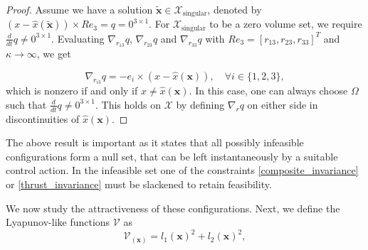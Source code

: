 \begin{proof}
Assume we have a solution $\tilde{\mathbf{x}} \in \mathcal{X}_\text{singular}$, denoted by $(x- \hat{x}(\tilde{\mathbf{x}})) \times R e_3 = q = 0^{3 \times 1}$.
For $\mathcal{X}_\text{singular}$ to be a zero volume set, we require $\frac{d}{dt} q \neq 0^{3 \times 1}$. Evaluating $\nabla_{r_{13}} q$, $\nabla_{r_{23}} q$ and $\nabla_{r_{33}} q$ with $R e_3 = [r_{13}, r_{23}, r_{33}]^T$ and $\kappa \rightarrow \infty$, we get 

\small
\begin{equation}\nonumber
\nabla_{r_{i3}} q = -e_i \times (x - \hat{x}(\mathbf{x})), \quad \forall i \in \{1,2,3\},
\end{equation}
\normalsize
which is nonzero if and only if $x \neq \hat{x}(\mathbf{x})$. In this case, one can always choose $\Omega$ such that $\frac{d}{dt} q \neq 0^{3 \times 1}$. This holds on $\mathcal{X}$ by defining $\nabla_{r} q$ on either side in discontinuities of $\hat{x}(\mathbf{x})$.
\end{proof}

The above result is important as it states that all possibly infeasible configurations form a null set, that can be left instantaneously by a suitable control action. In the infeasible set one of the constraints \eqref{composite_invariance} or \eqref{thrust_invariance} must be slackened to retain feasibility. 

\iffalse
This property is somewhat analogous to the stability result of the attitude controller \eqref{lee_attitude}, where almost global exponential stability of the attitude error is shown, except for a set of specific configurations. 
\fi
\iffalse
We now study the attractiveness of these configurations.
Next, we define the Lyapunov-like functions $\mathcal{V}$ as
\begin{equation}
    \mathcal{V}_(\mathbf{x})  = l_1(\mathbf{x})^2 + l_2(\mathbf{x})^2,
\end{equation}

